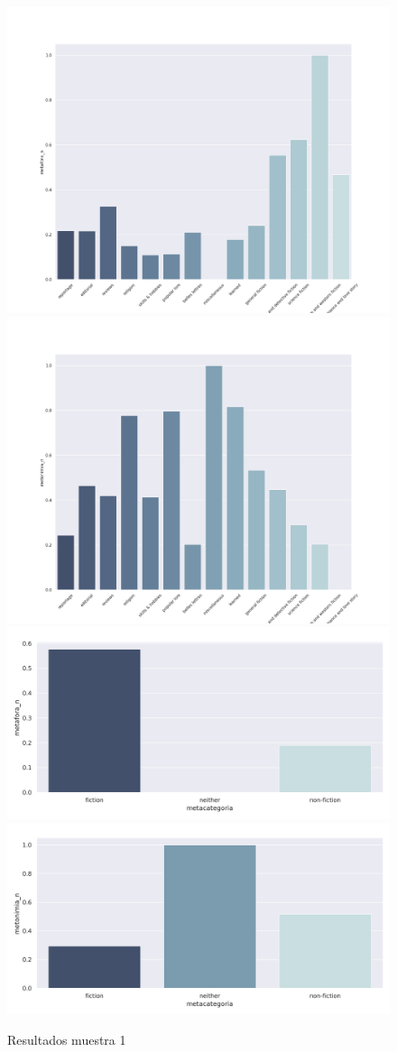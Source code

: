 \documentclass[twoside]{article}
\begin{document}
\begin{figure}[!htbp]
\centering
\includegraphics[width=.45\linewidth]{./resultados/graphs/muestra/c1_metafora.png}
\includegraphics[width=.45\linewidth]{./resultados/graphs/muestra/c1_metonimia.png}
\includegraphics[width=.45\linewidth]{./resultados/graphs/meta/c1_metacategoria_metafora.png}
\includegraphics[width=.45\linewidth]{./resultados/graphs/meta/c1_metacategoria_metonimia.png}
\caption{\label{fig:c1_resultados}Resultados muestra 1}
\end{figure}
\end{document}
